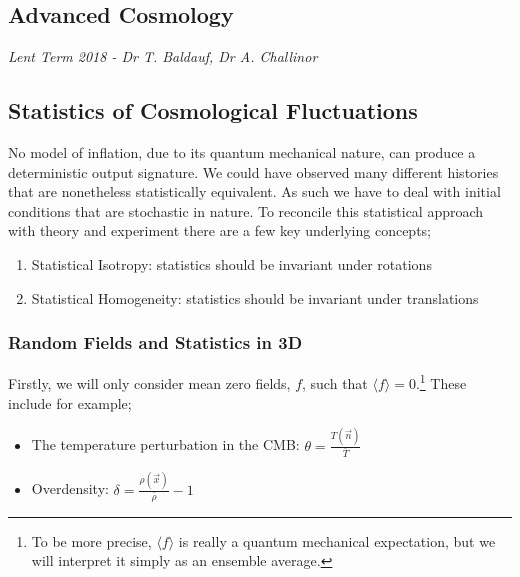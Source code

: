 \label{advcosmo}
\begin{chapterbox}
\vspace{-60pt}
\chapter{Advanced Cosmology}
\vspace{-30pt}
\centering\normalsize\textit{Lent Term 2018 - Dr T. Baldauf, Dr A. Challinor}
\end{chapterbox}
\vspace{20pt}
\minitoc
\newpage
\section{Statistics of Cosmological Fluctuations}
No model of inflation, due to its quantum mechanical nature, can produce a deterministic output signature. We could have observed many different histories that are nonetheless statistically equivalent. As such we have to deal with initial conditions that are stochastic in nature. To reconcile this statistical approach with theory and experiment there are a few key underlying concepts;
\begin{enumerate}
\item Statistical Isotropy: statistics should be invariant under rotations
\item Statistical Homogeneity: statistics should be invariant under translations
\end{enumerate}
\subsection{Random Fields and Statistics in 3D}
Firstly, we will only consider mean zero fields, $f$, such that $\langle f \rangle = 0$.\footnote{To be more precise, $\langle f \rangle$ is really a quantum mechanical expectation, but we will interpret it simply as an ensemble average.} These include for example;
\begin{itemize}
\item The temperature perturbation in the CMB: $\theta = \tfrac{T(\vec n)}{\bar{T}}$
\item Overdensity: $\delta = \tfrac{\rho(\vec x)}{\bar{\rho}} - 1$
\end{itemize}
